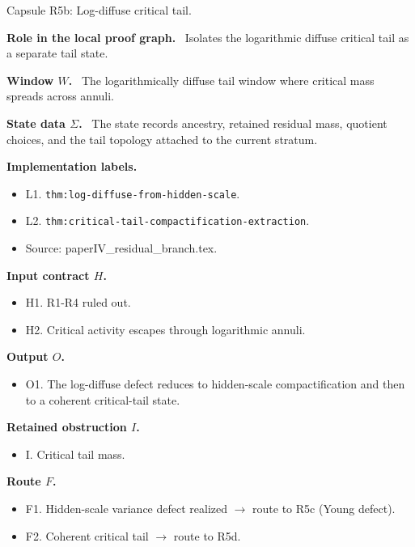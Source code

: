 \documentclass[11pt]{amsart}
\newcommand{\capsulefield}[1]{\par\smallskip\noindent\textbf{#1.}\ }
\begin{document}
\begin{proofcapsule}{Capsule R5b: Log-diffuse critical tail.}
  \capsulefield{Role in the local proof graph}
  Isolates the logarithmic diffuse critical tail as a separate tail state.

  \capsulefield{Window \(W\)}
The logarithmically diffuse tail window where critical mass spreads across annuli.

  \capsulefield{State data \(\Sigma\)}
The state records ancestry, retained residual mass, quotient choices, and the tail topology attached to the current stratum.

  \capsulefield{Implementation labels}
  \begin{itemize}[leftmargin=1.8em]
  \item L1. \texttt{thm:log-diffuse-from-hidden-scale}.
  \item L2. \texttt{thm:critical-tail-compactification-extraction}.
  \item Source: paperIV\_residual\_branch.tex.
  \end{itemize}

  \capsulefield{Input contract \(H\)}
  \begin{itemize}[leftmargin=1.8em]
  \item H1. R1-R4 ruled out.
  \item H2. Critical activity escapes through logarithmic annuli.
  \end{itemize}

  \capsulefield{Output \(O\)}
  \begin{itemize}[leftmargin=1.8em]
  \item O1. The log-diffuse defect reduces to hidden-scale compactification and then to a coherent critical-tail state.
  \end{itemize}

  \capsulefield{Retained obstruction \(I\)}
  \begin{itemize}[leftmargin=1.8em]
  \item I. Critical tail mass.
  \end{itemize}

  \capsulefield{Route \(F\)}
  \begin{itemize}[leftmargin=1.8em]
  \item F1. Hidden-scale variance defect realized $\to$ route to R5c (Young defect).
  \item F2. Coherent critical tail $\to$ route to R5d.
  \end{itemize}


\end{proofcapsule}
\end{document}
